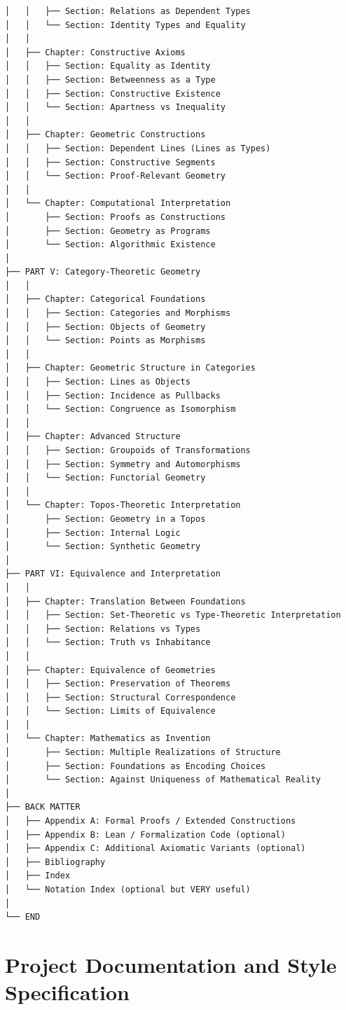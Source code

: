 \documentclass{book}
\begin{document}
\begin{verbatim}
│   │   ├── Section: Relations as Dependent Types
│   │   └── Section: Identity Types and Equality
│   │
│   ├── Chapter: Constructive Axioms
│   │   ├── Section: Equality as Identity
│   │   ├── Section: Betweenness as a Type
│   │   ├── Section: Constructive Existence
│   │   └── Section: Apartness vs Inequality
│   │
│   ├── Chapter: Geometric Constructions
│   │   ├── Section: Dependent Lines (Lines as Types)
│   │   ├── Section: Constructive Segments
│   │   └── Section: Proof-Relevant Geometry
│   │
│   └── Chapter: Computational Interpretation
│       ├── Section: Proofs as Constructions
│       ├── Section: Geometry as Programs
│       └── Section: Algorithmic Existence
│
├── PART V: Category-Theoretic Geometry
│   │
│   ├── Chapter: Categorical Foundations
│   │   ├── Section: Categories and Morphisms
│   │   ├── Section: Objects of Geometry
│   │   └── Section: Points as Morphisms
│   │
│   ├── Chapter: Geometric Structure in Categories
│   │   ├── Section: Lines as Objects
│   │   ├── Section: Incidence as Pullbacks
│   │   └── Section: Congruence as Isomorphism
│   │
│   ├── Chapter: Advanced Structure
│   │   ├── Section: Groupoids of Transformations
│   │   ├── Section: Symmetry and Automorphisms
│   │   └── Section: Functorial Geometry
│   │
│   └── Chapter: Topos-Theoretic Interpretation
│       ├── Section: Geometry in a Topos
│       ├── Section: Internal Logic
│       └── Section: Synthetic Geometry
│
├── PART VI: Equivalence and Interpretation
│   │
│   ├── Chapter: Translation Between Foundations
│   │   ├── Section: Set-Theoretic vs Type-Theoretic Interpretation
│   │   ├── Section: Relations vs Types
│   │   └── Section: Truth vs Inhabitance
│   │
│   ├── Chapter: Equivalence of Geometries
│   │   ├── Section: Preservation of Theorems
│   │   ├── Section: Structural Correspondence
│   │   └── Section: Limits of Equivalence
│   │
│   └── Chapter: Mathematics as Invention
│       ├── Section: Multiple Realizations of Structure
│       ├── Section: Foundations as Encoding Choices
│       └── Section: Against Uniqueness of Mathematical Reality
│
├── BACK MATTER
│   ├── Appendix A: Formal Proofs / Extended Constructions
│   ├── Appendix B: Lean / Formalization Code (optional)
│   ├── Appendix C: Additional Axiomatic Variants (optional)
│   ├── Bibliography
│   ├── Index
│   └── Notation Index (optional but VERY useful)
│
└── END

\end{verbatim}

\chapter{Project Documentation and Style Specification}
\end{document}
